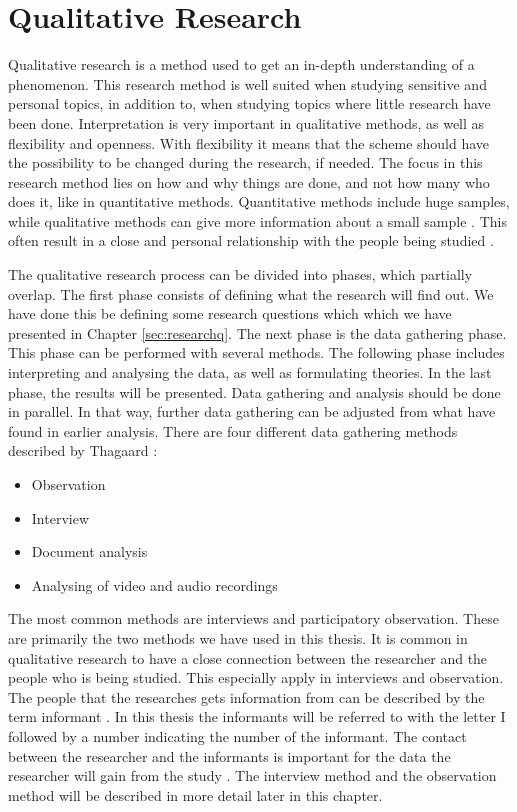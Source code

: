 \section{Qualitative Research}
Qualitative research is a method used to get an in-depth understanding of a phenomenon. This research method is well suited when studying sensitive and personal topics, in addition to, when studying topics where little research have been done. Interpretation is very important in qualitative methods, as well as flexibility and openness. With flexibility it means that the scheme should have the possibility to be changed during the research, if needed. The focus in this research method lies on how and why things are done, and not how many who does it, like in quantitative methods. Quantitative methods include huge samples, while qualitative methods can give more information about a small sample \cite{qualitative}. This often result in a close and personal relationship with the people being studied \cite{tjora}.  

The qualitative research process can be divided into phases, which partially overlap. The first phase consists of defining what the research will find out. We have done this be defining some research questions which which we have presented in Chapter \ref{sec:researchq}. The next phase is the data gathering phase. This phase can be performed with several methods. The following phase includes interpreting and analysing the data, as well as formulating theories. In the last phase, the results will be presented. Data gathering and analysis should be done in parallel. In that way, further data gathering can be adjusted from what have found in earlier analysis. There are four different data gathering methods described by Thagaard \cite{qualitative}:

\begin{itemize}
\item Observation 
\item Interview  
\item Document analysis
\item Analysing of video and audio recordings
\end{itemize}


The most common methods are interviews and participatory observation. These are primarily the two methods we have used in this thesis. It is common in qualitative research to have a close connection between the researcher and the people who is being studied. This especially apply in interviews and observation. The people that the researches gets information from can be described by the term informant \cite{qualitative}.  In this thesis the informants will be referred to with the letter I followed by a number indicating the number of the informant. The contact between the researcher and the informants is important for the data the researcher will gain from the study \cite{qualitative}. The interview method and the observation method will be described in more detail later in this chapter.

